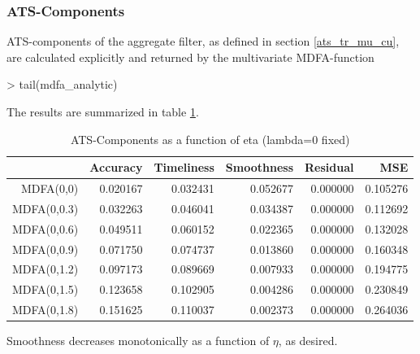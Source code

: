 \documentclass[a4paper]{book}
\begin{document}
\subsubsection{ATS-Components}

ATS-components of the aggregate filter, as defined in section \ref{ats_tr_mu_cu}, are calculated explicitly and returned by the multivariate MDFA-function
\begin{Schunk}
\begin{Sinput}
> tail(mdfa_analytic)
\end{Sinput}
\begin{Soutput}
188     else {                                                                      
189         return(list(b = b, trffkt = trffkt, rever = rever, Accuracy = Accuracy, 
190             Smoothness = Smoothness, Timeliness = Timeliness,                   
191             MS_error = MS_error))                                               
192     }                                                                           
193 }                                                                               
\end{Soutput}
\end{Schunk}
The results are summarized in table \ref{ats_comp_mdfa_S}.
\begin{table}[ht]
\centering
\begin{tabular}{rrrrrr}
  \hline
 & Accuracy & Timeliness & Smoothness & Residual & MSE \\ 
  \hline
MDFA(0,0) & 0.020167 & 0.032431 & 0.052677 & 0.000000 & 0.105276 \\ 
  MDFA(0,0.3) & 0.032263 & 0.046041 & 0.034387 & 0.000000 & 0.112692 \\ 
  MDFA(0,0.6) & 0.049511 & 0.060152 & 0.022365 & 0.000000 & 0.132028 \\ 
  MDFA(0,0.9) & 0.071750 & 0.074737 & 0.013860 & 0.000000 & 0.160348 \\ 
  MDFA(0,1.2) & 0.097173 & 0.089669 & 0.007933 & 0.000000 & 0.194775 \\ 
  MDFA(0,1.5) & 0.123658 & 0.102905 & 0.004286 & 0.000000 & 0.230849 \\ 
  MDFA(0,1.8) & 0.151625 & 0.110037 & 0.002373 & 0.000000 & 0.264036 \\ 
   \hline
\end{tabular}
\caption{ATS-Components as a function of eta (lambda=0 fixed)} 
\label{ats_comp_mdfa_S}
\end{table}Smoothness decreases  monotonically as a function of $\eta$, as desired.
\end{document}
